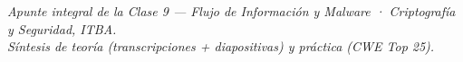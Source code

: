 \documentclass[11pt,a4paper]{article}
\begin{document}
\vfill
\begin{center}\small\itshape\color{black!60}
Apunte integral de la Clase 9 — Flujo de Información y Malware · Criptografía y Seguridad, ITBA.\\
Síntesis de teoría (transcripciones + diapositivas) y práctica (CWE Top 25).
\end{center}
\end{document}
